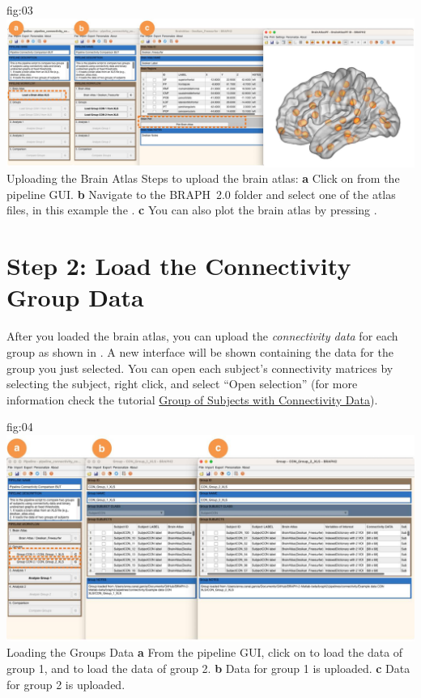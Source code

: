 \documentclass[justified]{tufte-handout}
\begin{document}
	{fig:03}
	{
	\includegraphics{fig03.jpg}
	}
	{Uploading the Brain Atlas}
	{
	Steps to upload the brain atlas:
	{\bf a} Click on  from the pipeline GUI.
	{\bf b} Navigate to the BRAPH~2.0 folder  and select one of the atlas files, in this example the . {\bf c} You can also plot the brain atlas by pressing . 
	}
 
\section{Step 2: Load the Connectivity Group Data}

After you loaded the brain atlas, you can upload the \emph{connectivity data} for each group as shown in . A new interface will be shown containing the data for the group you just selected. You can open each subject’s connectivity matrices by selecting the subject, right click, and select “Open selection” (for more information check the tutorial \href{https://github.com/softmatterlab/BRAPH-2-Matlab/tree/develop/tutorials/general/tut_gr_con}{Group of Subjects with Connectivity Data}).
	
	{fig:04}
	{
	\includegraphics{fig04.jpg}
	}
	{Loading the Groups Data}
	{
	{\bf a} From the pipeline GUI, click on  to load the data of group 1, and  to load the data of group 2.
	{\bf b} Data for group 1 is uploaded. {\bf c} Data for group 2 is uploaded.
	}
\end{document}
